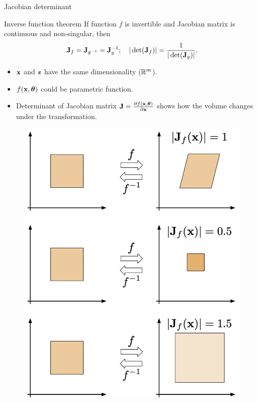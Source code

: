 \begin{frame}{Jacobian determinant}
	\begin{block}{Inverse function theorem}
		If function $f$ is invertible and Jacobian matrix is continuous and non-singular, then
		\vspace{-0.3cm}
		\[
		\mathbf{J}_f = \mathbf{J}_{g^{-1}} = \mathbf{J}_g^{-1}; \quad |\det (\mathbf{J}_f)| = \frac{1}{|\det (\mathbf{J}_g)|}.
		\]
		\vspace{-0.3cm}
	\end{block}
	\begin{minipage}{0.55\columnwidth}
		\begin{itemize}
			\item $\mathbf{x}$ and $\mathbf{z}$ have the same dimensionality ($\mathbb{R}^m$).
			\vfill
			\item $f(\mathbf{x}, \boldsymbol{\theta})$ could be parametric function.
			\vfill
			\item Determinant  of Jacobian matrix $\mathbf{J} =\frac{\partial f(\mathbf{x}, \boldsymbol{\theta})}{\partial \mathbf{x}}$ shows how the volume changes under the transformation.
		\end{itemize}
	\end{minipage}%
	\begin{minipage}{0.45\columnwidth}
		\begin{figure}
			\includegraphics[width=0.8\linewidth]{figs/jacobian_det}
		\end{figure}
	\end{minipage}
\end{frame}

